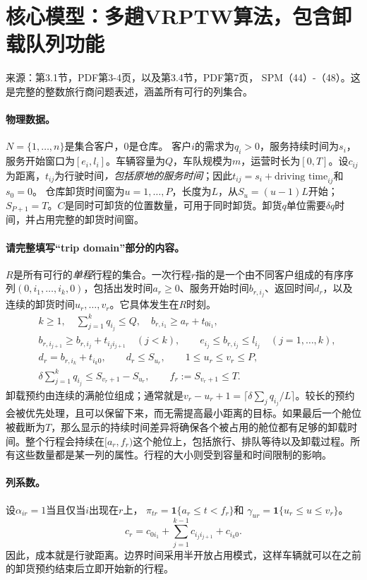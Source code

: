 \documentclass[11pt]{article}
\begin{document}
\section*{核心模型：多趟VRPTW算法，包含卸载队列功能}
来源：第3.1节，PDF第3-4页，以及第3.4节，PDF第7页，
SPM（44）-（48）。这是完整的整数旅行商问题表述，涵盖所有可行的列集合。
\paragraph{物理数据。}
$N=\{1,\ldots,n\}$是集合客户，$0$是仓库。
客户$i$的需求为$q_i>0$，服务持续时间为$s_i$，服务开始窗口为$[e_i,l_i]$。车辆容量为$Q$，车队规模为$m$，运营时长为$[0,T]$。设$c_{ij}$为距离，$t_{ij}$为行驶时间\emph{，包括原地的服务时间}；因此$t_{ij}=s_i+\text{driving time}_{ij}$和$s_0=0$。
仓库卸货时间窗为$u=1,\ldots,P$，长度为$L$，从$S_u=(u-1)L$开始；$S_{P+1}=T$。$C$是同时可卸货的位置数量，可用于同时卸货。卸货$q$单位需要$\delta q$时间，并占用完整的卸货时间窗。
\paragraph{请完整填写“trip domain”部分的内容。}
$R$是所有可行的\emph{单程}行程的集合。一次行程$r$指的是一个由不同客户组成的有序序列$(0,i_1,\ldots,i_k,0)$，包括出发时间$a_r\ge0$、服务开始时间$b_{r,i_j}$、返回时间$d_r$，以及连续的卸货时间$u_r,\ldots,v_r$。它具体发生在$R$时刻。
\begin{align*}
&k\ge1,\quad \sum_{j=1}^kq_{i_j}\le Q,\quad
 b_{r,i_1}\ge a_r+t_{0i_1},\\
&b_{r,i_{j+1}}\ge b_{r,i_j}+t_{i_ji_{j+1}}\quad(j<k),\qquad
 e_{i_j}\le b_{r,i_j}\le l_{i_j}\quad(j=1,\ldots,k),\\
&d_r=b_{r,i_k}+t_{i_k0},\qquad d_r\le S_{u_r},\qquad
 1\le u_r\le v_r\le P,\\
&\delta\sum_{j=1}^kq_{i_j}\le S_{v_r+1}-S_{u_r},\qquad
 f_r:=S_{v_r+1}\le T.
\end{align*}
卸载预约由连续的满舱位组成；通常就是$v_r-u_r+1=\lceil\delta\sum_jq_{i_j}/L\rceil$。较长的预约会被优先处理，且可以保留下来，而无需提高最小距离的目标。如果最后一个舱位被截断为$T$，那么显示的持续时间差异将确保各个被占用的舱位都有足够的卸载时间。整个行程会持续在$[a_r,f_r)$这个舱位上，包括旅行、排队等待以及卸载过程。所有这些数量都是某一列的属性。行程的大小则受到容量和时间限制的影响。
\paragraph{列系数。}
设$\alpha_{ir}=1$当且仅当$i$出现在$r$上，
$\pi_{tr}=\mathbf1\{a_r\le t<f_r\}$和
$\gamma_{ur}=\mathbf1\{u_r\le u\le v_r\}$。
\[
 c_r=c_{0i_1}+\sum_{j=1}^{k-1}c_{i_ji_{j+1}}+c_{i_k0}.
\]
因此，成本就是行驶距离。边界时间采用半开放占用模式，这样车辆就可以在之前的卸货预约结束后立即开始新的行程。
\end{document}

